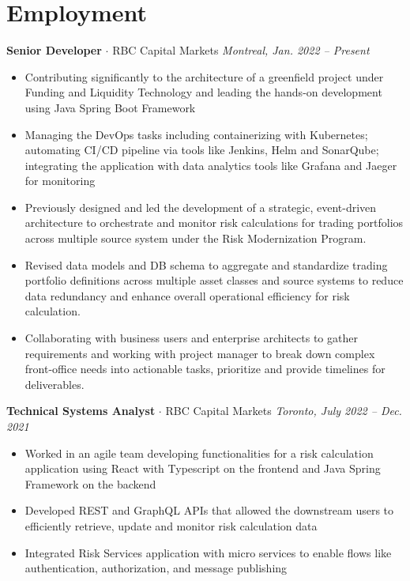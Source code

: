 \documentclass[a4paper,10pt]{article}
\newcommand{\jobentry}[4]{
    \noindent
    \textbf{\large#3}{ $\cdot$ }{#1} \hfill \textit{#2, #4}
    \vspace{-0.5em} %
}
\begin{document}
\section*{Employment}
\jobentry{RBC Capital Markets}{Montreal}{Senior Developer}{Jan. 2022 – Present}
\begin{itemize}[left=0em]
    \item Contributing significantly to the architecture of a greenfield project under Funding and Liquidity Technology and leading the hands-on development using Java Spring Boot Framework
    \item Managing the DevOps tasks including containerizing with Kubernetes; automating CI/CD pipeline via tools like Jenkins, Helm and SonarQube; integrating the application with data analytics tools like Grafana and Jaeger for monitoring
    \item Previously designed and led the development of a strategic, event-driven architecture to orchestrate and monitor risk calculations for trading portfolios across multiple source system under the Risk Modernization Program.
    \item Revised data models and DB schema to aggregate and standardize trading portfolio definitions across multiple asset classes and source systems to reduce data redundancy and enhance overall operational efficiency for risk calculation.
    \item Collaborating with business users and enterprise architects to gather requirements and working with project manager to break down complex front-office needs into actionable tasks, prioritize and provide timelines for deliverables.
\end{itemize}
\vspace{0.4em}
\jobentry{RBC Capital Markets}{Toronto}{Technical Systems Analyst}{July 2022 – Dec. 2021}
\begin{itemize}[left=0em]
    \item Worked in an agile team developing functionalities for a risk calculation application using React with Typescript on the frontend and Java Spring Framework on the backend
    \item Developed REST and GraphQL APIs that allowed the downstream users to efficiently retrieve, update and monitor risk calculation data
    \item Integrated Risk Services application with micro services to enable flows like authentication, authorization, and message publishing
\end{itemize}
\vspace{0.4em}
\end{document}
